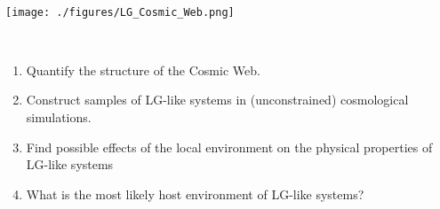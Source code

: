 \documentclass[8pt,fleqn]{beamer}
\begin{document}
\begin{frame}
\begin{tcolorbox}[colback=white!5,colframe=black!75!black,title=Cosmic Web]\centering

\

	\texttt{[image: ./figures/LG\_Cosmic\_Web.png]}

\

\end{tcolorbox}
\end{frame}
\begin{frame}
\begin{tcolorbox}[colback=white,colframe=black!75!black,title=Motivation]\justifying
	
	\begin{enumerate}
	\color{black}
	\item Quantify the structure of the Cosmic Web.
	\item Construct samples of LG-like systems in (unconstrained) cosmological 
	simulations.
	\item Find possible effects of the local environment on the physical 
	properties of LG-like systems
	\item What is the most likely host environment of LG-like systems?
	\end{enumerate}

\end{tcolorbox}
\end{frame}
\end{document}
